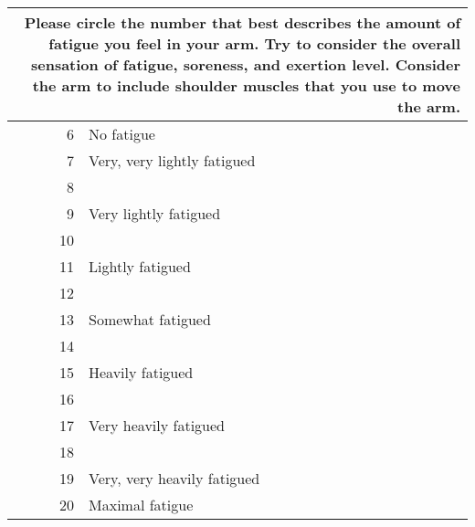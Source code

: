 \begin{tabular}{rl}
\toprule
    \multicolumn{2}{p{4.0in}}{
Please circle the number that best describes the amount of fatigue you feel in your arm.
Try to consider the overall sensation of fatigue, soreness, and exertion level.
Consider the arm to include shoulder muscles that you use to move the arm.
} \\
\midrule
6  & No fatigue \\
7  & Very, very lightly fatigued \\
8  & \\
9  & Very lightly fatigued \\
10 & \\
11 & Lightly fatigued \\
12 & \\
13 & Somewhat fatigued \\
14 & \\
15 & Heavily fatigued \\
16 & \\
17 & Very heavily fatigued \\
18 & \\
19 & Very, very heavily fatigued \\
20 & Maximal fatigue \\
\bottomrule
\end{tabular}
